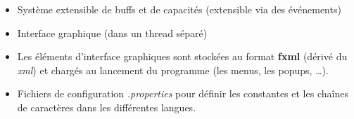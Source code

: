 \begin{itemize}
    \item Système extensible de buffs et de capacités (extensible via des événements)
    \item Interface graphique (dans un thread séparé)
    \item Les éléments d'interface graphiques sont stockées au format \textbf{fxml} (dérivé du \emph{xml}) et chargés au lancement du
        programme (les menus, les popups, …).
    \item Fichiers de configuration \emph{.properties} pour définir les constantes et les chaînes de caractères
        dans les différentes langues.
\end{itemize}

